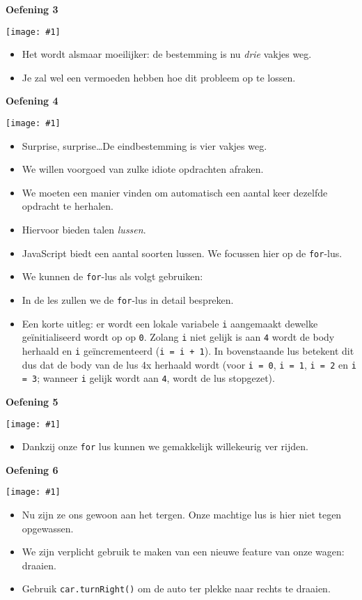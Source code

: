 \documentclass[a4paper]{article}
\newcommand{\newexercise}[1]{\clearpage\begin{center}\Huge\bf #1\end{center}}
\newcommand{\exercisemap}[1]{\begin{center}\texttt{[image: \#1]}\end{center}}
\newcommand{\code}[1]{
  \begin{center}
    \begin{minipage}{.8\linewidth}
      
    \end{minipage}
  \end{center}
}
\begin{document}
\newexercise{Oefening 3}
\exercisemap{ex3}

\begin{itemize}
  \item Het wordt alsmaar moeilijker: de bestemming is nu \emph{drie} vakjes weg.
  \item Je zal wel een vermoeden hebben hoe dit probleem op te lossen.
\end{itemize}



\newexercise{Oefening 4}
\exercisemap{ex4}

\begin{itemize}
  \item Surprise, surprise\dots De eindbestemming is vier vakjes weg.
  \item We willen voorgoed van zulke idiote opdrachten afraken.
  \item We moeten een manier vinden om automatisch een aantal keer
        dezelfde opdracht te herhalen.
  \item Hiervoor bieden talen \emph{lussen}.
  \item JavaScript biedt een aantal soorten lussen. We focussen hier op de \verb'for'-lus.
  \item We kunnen de \verb'for'-lus als volgt gebruiken:
        \code{for.js}
  \item In de les zullen we de \verb'for'-lus in detail bespreken.
  \item Een korte uitleg: er wordt een lokale variabele \verb'i' aangemaakt
        dewelke ge\"initialiseerd wordt op op \verb'0'.
        Zolang \verb'i' niet gelijk is aan \verb'4' wordt
        de body herhaald en \verb'i' ge\"incrementeerd (\verb'i = i + 1').
        In bovenstaande lus betekent dit dus dat de body
        van de lus 4x herhaald wordt (voor \verb'i = 0', \verb'i = 1',
        \verb'i = 2' en \verb'i = 3'; wanneer \verb'i' gelijk wordt aan \verb'4',
        wordt de lus stopgezet).
\end{itemize}


\newexercise{Oefening 5}
\exercisemap{ex5}

\begin{itemize}
  \item Dankzij onze \verb'for' lus kunnen we gemakkelijk willekeurig ver rijden.
\end{itemize}



\newexercise{Oefening 6}
\exercisemap{ex6}

\begin{itemize}
  \item Nu zijn ze ons gewoon aan het tergen. Onze machtige lus is hier niet tegen opgewassen.
  \item We zijn verplicht gebruik te maken van een nieuwe feature van onze wagen: draaien.
  \item Gebruik \verb'car.turnRight()' om de auto ter plekke naar rechts te draaien.
\end{itemize}
\end{document}
